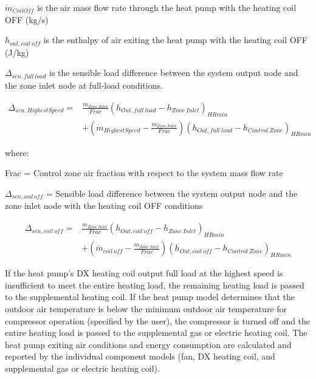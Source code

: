 \({\dot m}_{CoilOff}\) is the air mass flow rate through the heat pump with the heating coil OFF (kg/s)

\(h_{out,coil~off}\) is the enthalpy of air exiting the heat pump with the heating coil OFF (J/kg)

\(\Delta_{sen,full~load}\) is the sensible load difference between the system output node and the zone inlet node at full-load conditions.

\begin{equation}
\begin{array}{rl}
{\Delta_{sen,HighestSpeed}} =& \frac{{{{\dot m}_{Zone~Inlet}}}}{{Frac}}{\left( {{h_{Out,full~load}} - {h_{Zone~Inlet}}} \right)_{HRmin}} \\
 & + \left( {{{\dot m}_{HighestSpeed}} - \frac{{{{\dot m}_{Zone~Inlet}}}}{{Frac}}} \right){\left( {h_{Out,full~load} - {h_{Control~Zone}}} \right)_{HRmin}}
\end{array}
\end{equation}

where:

Frac = Control zone air fraction with respect to the system mass flow rate

\(\Delta_{sen,coil\, off}\) = Sensible load difference between the system output node and the zone inlet node with the heating coil OFF conditions

\begin{equation}
\begin{array}{rl}
{\Delta_{sen,coil~off}} =& \frac{{{{\dot m}_{Zone~Inlet}}}}{{Frac}}{\left( {{h_{Out,coil~off}} - {h_{Zone~Inlet}}} \right)_{HRmin}} \\
 & + \left( {{{\dot m}_{coil~off}} - \frac{{{{\dot m}_{Zone~Inlet}}}}{{Frac}}} \right){\left( {{h_{Out,coil~off}} - {h_{Control~Zone}}} \right)_{HRmin}}
\end{array}
\end{equation}

If the heat pump's DX heating coil output full load at the highest speed is insufficient to meet the entire heating load, the remaining heating load is passed to the supplemental heating coil. If the heat pump model determines that the outdoor air temperature is below the minimum outdoor air temperature for compressor operation (specified by the user), the compressor is turned off and the entire heating load is passed to the supplemental gas or electric heating coil. The heat pump exiting air conditions and energy consumption are calculated and reported by the individual component models (fan, DX heating coil, and supplemental gas or electric heating coil).

